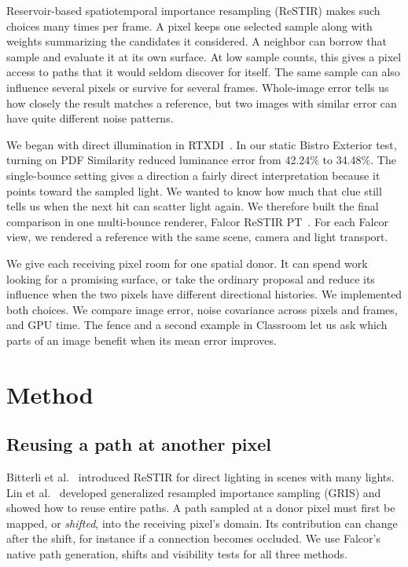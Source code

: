 \documentclass[a4paper,twocolumn]{article}
\begin{document}
Reservoir-based spatiotemporal importance resampling (ReSTIR) makes such choices many times per frame. A pixel keeps one selected sample along with weights summarizing the candidates it considered. A neighbor can borrow that sample and evaluate it at its own surface. At low sample counts, this gives a pixel access to paths that it would seldom discover for itself. The same sample can also influence several pixels or survive for several frames. Whole-image error tells us how closely the result matches a reference, but two images with similar error can have quite different noise patterns.

We began with direct illumination in RTXDI~\cite{rtxdi}. In our static Bistro Exterior test, turning on PDF Similarity reduced luminance error from 42.24\% to 34.48\%. The single-bounce setting gives a direction a fairly direct interpretation because it points toward the sampled light. We wanted to know how much that clue still tells us when the next hit can scatter light again. We therefore built the final comparison in one multi-bounce renderer, Falcor ReSTIR PT~\cite{falcor}. For each Falcor view, we rendered a reference with the same scene, camera and light transport.

We give each receiving pixel room for one spatial donor. It can spend work looking for a promising surface, or take the ordinary proposal and reduce its influence when the two pixels have different directional histories. We implemented both choices. We compare image error, noise covariance across pixels and frames, and GPU time. The fence and a second example in Classroom let us ask which parts of an image benefit when its mean error improves.

\section{Method}
\subsection{Reusing a path at another pixel}
Bitterli et al.~\cite{bitterli} introduced ReSTIR for direct lighting in scenes with many lights. Lin et al.~\cite{lin} developed generalized resampled importance sampling (GRIS) and showed how to reuse entire paths. A path sampled at a donor pixel must first be mapped, or \emph{shifted}, into the receiving pixel's domain. Its contribution can change after the shift, for instance if a connection becomes occluded. We use Falcor's native path generation, shifts and visibility tests for all three methods.
\end{document}
